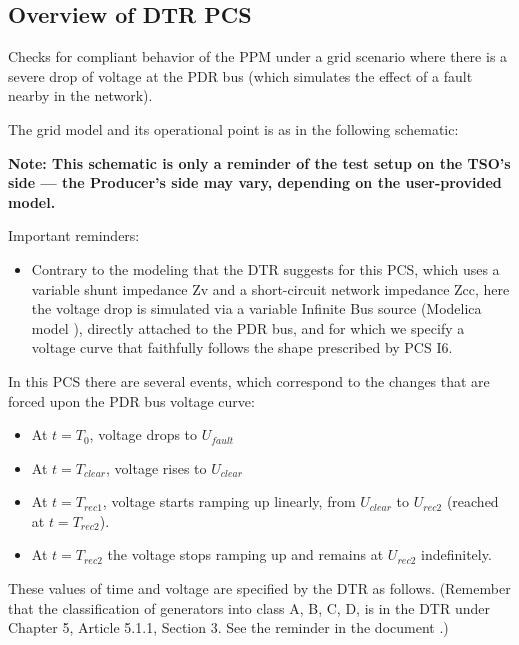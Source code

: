     \subsection{Overview of DTR PCS \DTRPcs}

    Checks for compliant behavior of the PPM under a grid scenario where there is a
    severe drop of voltage at the PDR bus (which simulates the effect of a fault
    nearby in the network).

    The grid model and its operational point is as in the following schematic:
    \begin{center}
        
    \end{center}
    \begin{center}
        \small \textbf{Note: This schematic is only a reminder of the test setup on the TSO's
        side --- the Producer's side may vary, depending on the user-provided model.}
    \end{center}

    \noindent Important reminders:
    \begin{itemize}
        \item Contrary to the modeling that the DTR suggests for this PCS, which uses a
        variable shunt impedance Zv and a short-circuit network impedance Zcc, here
        the voltage drop is simulated via a variable Infinite Bus source (Modelica
        model ), directly attached to the PDR bus, and for
        which we specify a voltage curve that faithfully follows the shape prescribed
        by PCS I6.
    \end{itemize}

    In this PCS there are several events, which correspond to the changes that are
    forced upon the PDR bus voltage curve:
    \begin{itemize}
        \item At $t = T_{0}$, voltage drops to $U_{fault}$
        \item At $t = T_{clear}$, voltage rises to $U_{clear}$
        \item At $t = T_{rec1}$, voltage starts ramping up linearly, from $U_{clear}$ to
        $U_{rec2}$ (reached at $t = T_{rec2}$).
        \item At $t = T_{rec2}$ the voltage stops ramping up and remains at $U_{rec2}$
        indefinitely.
    \end{itemize}
    These values of time and voltage are specified by the DTR as follows. (Remember
    that the classification of generators into class A, B, C, D, is in the DTR under
    Chapter 5, Article 5.1.1, Section 3. See the reminder in the document
    .)


